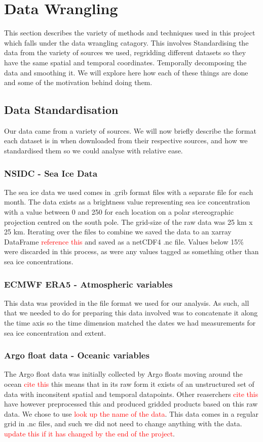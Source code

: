 \documentclass[../main.tex]{subfiles}
\begin{document}
\section{Data Wrangling}

This section describes the variety of methods and techniques used in this project which falls under the data wrangling catagory. This involves Standardising the data from the variety of sources we used, regridding different datasets so they have the same spatial and temporal coordinates. Temporally decomposing the data and smoothing it. We will explore here how each of these things are done and some of the motivation behind doing them.

\subsection{Data Standardisation}
Our data came from a variety of sources. We will now briefly describe the format each dataset is in when downloaded from their respective sources, and how we standardised them so we could analyse with relative ease.

\subsubsection*{NSIDC - Sea Ice Data}
The sea ice data we used comes in .grib format files with a separate file for each month. The data exists as a brightness value representing sea ice concentration with a value between 0 and 250 for each location on a polar stereographic projection centred on the south pole. The grid-size of the raw data was 25 km x 25 km. Iterating over the files to combine we saved the data to an xarray DataFrame \textcolor{red}{reference this} and saved as a netCDF4 .nc file. Values below 15\% were discarded in this process, as were any values tagged as something other than sea ice concentrations. 

\subsubsection*{ECMWF ERA5 - Atmospheric variables}
This data was provided in the file format we used for our analysis. As such, all that we needed to do for preparing this data involved was to concatenate it along the time axis so the time dimension matched the dates we had measurements for sea ice concentration and extent.

\subsubsection*{Argo float data - Oceanic variables}
The Argo float data was initially collected by Argo floats moving around the ocean \textcolor{red}{cite this} this means that in its raw form it exists of an unstructured set of data with inconsitent spatial and temporal datapoints. Other reaserchers \textcolor{red}{cite this} have however preprocessed this and produced gridded products based on this raw data. We chose to use  \textcolor{red}{look up the name of the data}. This data comes in a regular grid in .nc files, and such we did not need to change anything with the data. \textcolor{red}{update this if it has changed by the end of the project}.
\end{document}
